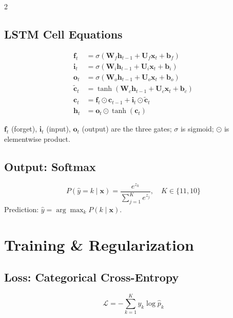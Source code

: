\documentclass[10pt, a4paper]{article}
\begin{document}
\begin{multicols}{2}
\subsection{LSTM Cell Equations}

\begin{align}
\mathbf{f}_t &= \sigma(\mathbf{W}_f \mathbf{h}_{t-1} + \mathbf{U}_f \mathbf{x}_t + \mathbf{b}_f) \\
\mathbf{i}_t &= \sigma(\mathbf{W}_i \mathbf{h}_{t-1} + \mathbf{U}_i \mathbf{x}_t + \mathbf{b}_i) \\
\mathbf{o}_t &= \sigma(\mathbf{W}_o \mathbf{h}_{t-1} + \mathbf{U}_o \mathbf{x}_t + \mathbf{b}_o) \\
\tilde{\mathbf{c}}_t &= \tanh(\mathbf{W}_c \mathbf{h}_{t-1} + \mathbf{U}_c \mathbf{x}_t + \mathbf{b}_c) \\
\mathbf{c}_t &= \mathbf{f}_t \odot \mathbf{c}_{t-1} + \mathbf{i}_t \odot \tilde{\mathbf{c}}_t \\
\mathbf{h}_t &= \mathbf{o}_t \odot \tanh(\mathbf{c}_t)
\end{align}

$\mathbf{f}_t$ (forget), $\mathbf{i}_t$ (input), $\mathbf{o}_t$ (output)
are the three gates; $\sigma$ is sigmoid; $\odot$ is elementwise product.

\subsection{Output: Softmax}

\begin{equation}
P(\hat{y} = k \mid \mathbf{x}) = \frac{e^{z_k}}{\displaystyle\sum_{j=1}^{K} e^{z_j}},
\quad K \in \{11, 10\}
\end{equation}
Prediction: $\hat{y} = \arg\max_k P(k \mid \mathbf{x})$.

\section{Training \& Regularization}

\subsection{Loss: Categorical Cross-Entropy}

\begin{equation}
\mathcal{L} = -\sum_{k=1}^{K} y_k \log \hat{p}_k
\end{equation}


\end{multicols}
\end{document}

